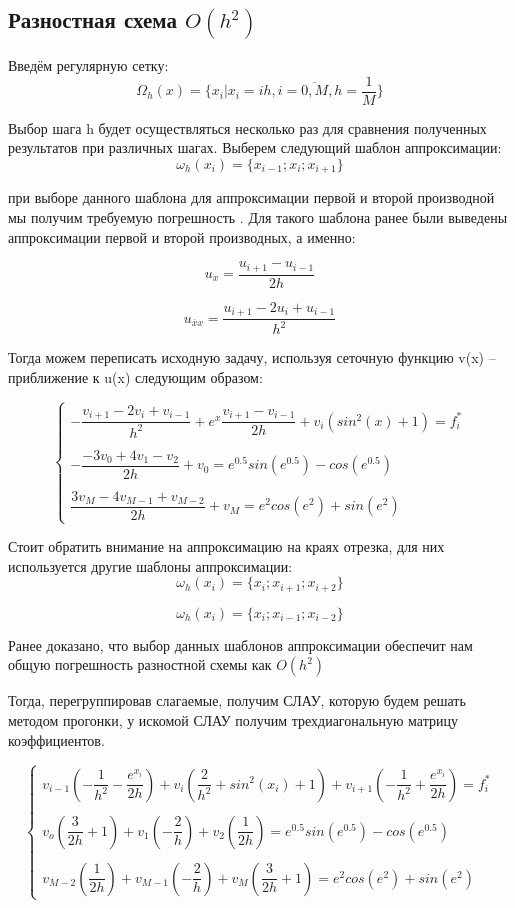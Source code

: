 \documentclass[12pt]{article}
\begin{document}
\subsection{Разностная схема $O(h^2)$}
Введём регулярную сетку:
$$
\Omega_h(x) = \{x_i | x_i = ih, i = \overline{0, M}, h = \dfrac{1}{M}\}
$$

Выбор шага h будет осуществляться несколько раз для сравнения полученных результатов при различных шагах.
Выберем следующий шаблон аппроксимации:
$$
\omega_h(x_i) = \{ x_{i-1}; x_i; x_{i + 1}\}
$$

при выборе данного шаблона для аппроксимации первой и второй производной  мы получим требуемую погрешность . Для такого шаблона ранее были выведены аппроксимации первой и второй производных, а именно:

$$
u_{\dot{x}} = \dfrac{u_{i + 1} - u_{i - 1}}{2h}
$$

$$
u_{\overline{x}x} = \dfrac{u_{i + 1} -2u_i+ u_{i - 1}}{h^2}
$$

Тогда можем переписать исходную задачу, используя сеточную функцию v(x) – приближение к u(x) следующим образом:

$$
\begin{cases}
-\dfrac{v_{i+1} - 2v_i + v_{i-1}}{h^2} + e^x\dfrac{v_{i+1} - v_{i-1}}{2h} + v_i(sin^2(x) + 1) = f_i^* \\
\\
- \dfrac{-3v_0 + 4v_1 - v_2}{2h} + v_0 = e^{0.5}sin(e^{0.5}) - cos(e^{0.5}) \\
\\
\dfrac{3v_M - 4v_{M-1} + v_{M-2}}{2h} + v_M = e^2cos(e^2) + sin(e^2)
\end{cases}
$$

Стоит обратить внимание на аппроксимацию на краях отрезка, для них используется другие шаблоны аппроксимации:
$$
\omega_h(x_i) = \{ x_{i}; x_{i + 1}; x_{i + 2}\}
$$

$$
\omega_h(x_i) = \{ x_i; x_{i - 1}; x_{i - 2}\}
$$

Ранее доказано, что выбор данных шаблонов аппроксимации обеспечит нам общую погрешность разностной схемы как 
$O(h^2)$

Тогда, перегруппировав слагаемые, получим СЛАУ, которую будем решать методом прогонки, у искомой СЛАУ получим трехдиагональную матрицу коэффициентов.

$$
\begin{cases}
v_{i-1}(-\dfrac{1}{h^2} - \dfrac{e^{x_i}}{2h}) + v_i(\dfrac{2}{h^2} + sin^2(x_i) + 1) + v_{i + 1}(-\dfrac{1}{h^2} + \dfrac{e^{x_i}}{2h}) = f_i^*\\
\\
v_o(\dfrac{3}{2h}  +1) + v_1(-\dfrac{2}{h}) + v_2(\dfrac{1}{2h}) = e^{0.5}sin(e^{0.5}) - cos(e^{0.5})\\
\\
v_{M-2}(\dfrac{1}{2h}) + v_{M-1}(-\dfrac{2}{h})  +v_M(\dfrac{3}{2h} + 1) = e^2cos(e^2) + sin(e^2)
\end{cases}
$$
\end{document}
